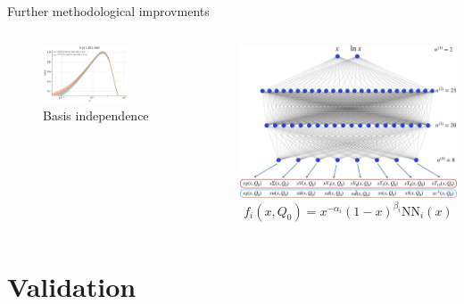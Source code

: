 \documentclass[aspectratio=169,9pt]{beamer}
\begin{document}
\begin{frame}[t]{Further methodological improvments}
\begin{columns}[T]
\begin{column}{0.48\textwidth}
\begin{itemize}
            \end{itemize}
            \begin{figure}
                \includegraphics[width=0.6\textwidth]{flavour_evolution_V}
                \caption*{Basis independence}
            \end{figure}
        \end{column}
        \begin{column}{0.48\textwidth}
            \includegraphics[width=1.0\textwidth]{NNarch}
            \begin{equation*}
                f_{i}\left(x, Q_{0}\right)=x^{-\alpha_{i}}(1-x)^{\beta_{i}} \mathrm{NN}_{i}(x)
            \end{equation*}
        \end{column}
    \end{columns}
\end{frame}



\section{Validation}
\end{document}
